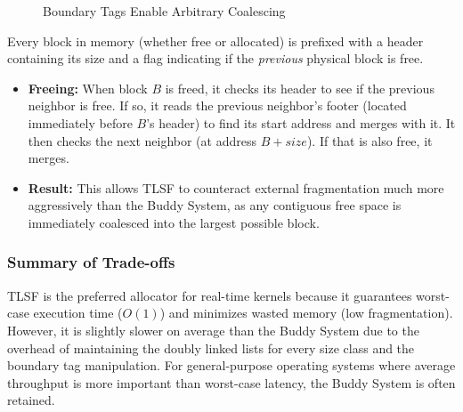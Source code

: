 \documentclass[a4paper,10pt,twoside]{report}
\theoremstyle{definition}
\begin{document}
\begin{figure}[htbp]
\centering
{}
\caption{Boundary Tags Enable Arbitrary Coalescing}
\label{fig:tlsf_coalesce}
\end{figure}

Every block in memory (whether free or allocated) is prefixed with a header containing its size and a flag indicating if the \textit{previous} physical block is free.
\begin{itemize}
    \item \textbf{Freeing:} When block $B$ is freed, it checks its header to see if the previous neighbor is free. If so, it reads the previous neighbor's footer (located immediately before $B$'s header) to find its start address and merges with it. It then checks the next neighbor (at address $B + size$). If that is also free, it merges.
    \item \textbf{Result:} This allows TLSF to counteract external fragmentation much more aggressively than the Buddy System, as any contiguous free space is immediately coalesced into the largest possible block.
\end{itemize}

\subsubsection{Summary of Trade-offs}
TLSF is the preferred allocator for real-time kernels because it guarantees worst-case execution time ($O(1)$) and minimizes wasted memory (low fragmentation). However, it is slightly slower on average than the Buddy System due to the overhead of maintaining the doubly linked lists for every size class and the boundary tag manipulation. For general-purpose operating systems where average throughput is more important than worst-case latency, the Buddy System is often retained.
\end{document}
